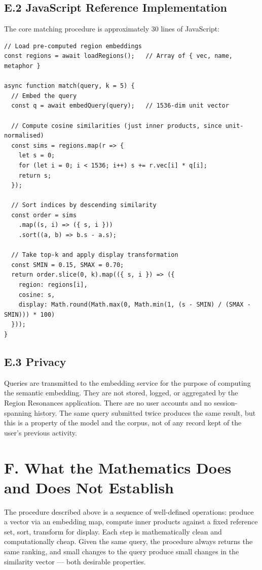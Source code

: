\documentclass[11pt]{article}
\begin{document}
\subsection*{E.2 JavaScript Reference Implementation}
The core matching procedure is approximately 30 lines of JavaScript:

\begin{verbatim}
// Load pre-computed region embeddings
const regions = await loadRegions();   // Array of { vec, name, metaphor }

async function match(query, k = 5) {
  // Embed the query
  const q = await embedQuery(query);   // 1536-dim unit vector

  // Compute cosine similarities (just inner products, since unit-normalised)
  const sims = regions.map(r => {
    let s = 0;
    for (let i = 0; i < 1536; i++) s += r.vec[i] * q[i];
    return s;
  });

  // Sort indices by descending similarity
  const order = sims
    .map((s, i) => ({ s, i }))
    .sort((a, b) => b.s - a.s);

  // Take top-k and apply display transformation
  const SMIN = 0.15, SMAX = 0.70;
  return order.slice(0, k).map(({ s, i }) => ({
    region: regions[i],
    cosine: s,
    display: Math.round(Math.max(0, Math.min(1, (s - SMIN) / (SMAX - SMIN))) * 100)
  }));
}
\end{verbatim}

\subsection*{E.3 Privacy}
Queries are transmitted to the embedding service for the purpose of computing the semantic embedding. They are not stored, logged, or aggregated by the Region Resonances application. There are no user accounts and no session-spanning history. The same query submitted twice produces the same result, but this is a property of the model and the corpus, not of any record kept of the user's previous activity.

\section*{F. What the Mathematics Does and Does Not Establish}

The procedure described above is a sequence of well-defined operations: produce a vector via an embedding map, compute inner products against a fixed reference set, sort, transform for display. Each step is mathematically clean and computationally cheap. Given the same query, the procedure always returns the same ranking, and small changes to the query produce small changes in the similarity vector --- both desirable properties.
\end{document}
